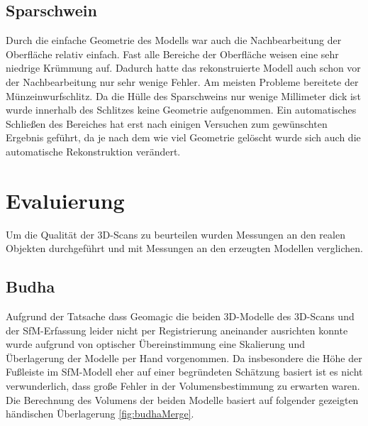 \documentclass[]{article}
\begin{document}
\subsection{Sparschwein}
Durch die einfache Geometrie des Modells war auch die Nachbearbeitung der Oberfläche relativ einfach. Fast alle Bereiche der Oberfläche weisen eine sehr niedrige Krümmung auf. Dadurch hatte das rekonstruierte Modell auch schon vor der Nachbearbeitung nur sehr wenige Fehler. Am meisten Probleme bereitete der Münzeinwurfschlitz. Da die Hülle des Sparschweins nur wenige Millimeter dick ist wurde innerhalb des Schlitzes keine Geometrie aufgenommen. Ein automatisches Schließen des Bereiches hat erst nach einigen Versuchen zum gewünschten Ergebnis geführt, da je nach dem wie viel Geometrie gelöscht wurde sich auch die automatische Rekonstruktion verändert. 

\section{Evaluierung}
Um die Qualität der 3D-Scans zu beurteilen wurden Messungen an den realen Objekten durchgeführt und mit Messungen an den erzeugten Modellen verglichen.

\subsection{Budha}

Aufgrund der Tatsache dass Geomagic die beiden 3D-Modelle des 3D-Scans und der SfM-Erfassung leider nicht per Registrierung aneinander ausrichten konnte wurde aufgrund von optischer Übereinstimmung eine Skalierung und Überlagerung der Modelle per Hand vorgenommen. Da insbesondere die Höhe der Fußleiste im SfM-Modell eher auf einer begründeten Schätzung basiert ist es nicht verwunderlich, dass große Fehler in der Volumensbestimmung zu erwarten waren. Die Berechnung des Volumens der beiden Modelle basiert auf folgender gezeigten händischen Überlagerung \ref{fig:budhaMerge}.
\end{document}
